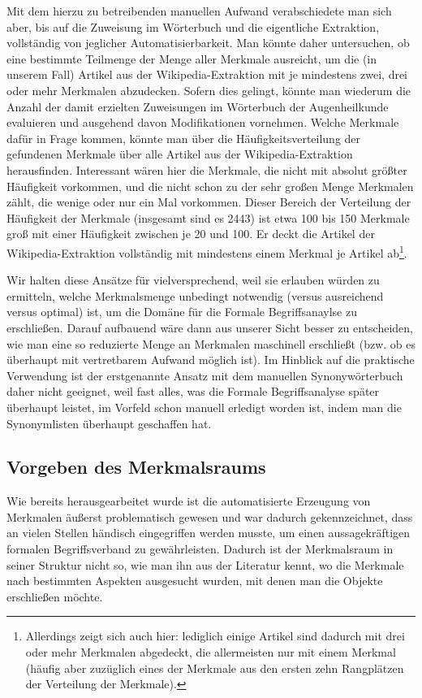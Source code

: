 \documentclass[pagesize,DIV=calc,12pt,draft]{scrreprt}
\begin{document}
Mit dem hierzu zu betreibenden manuellen Aufwand verabschiedete man sich aber, bis auf die Zuweisung im Wörterbuch und die eigentliche Extraktion, vollständig von jeglicher Automatisierbarkeit.
Man könnte daher untersuchen, ob eine bestimmte Teilmenge der Menge aller Merkmale ausreicht, um die (in unserem Fall) Artikel aus der Wikipedia-Extraktion mit je mindestens zwei, drei oder mehr Merkmalen abzudecken.
Sofern dies gelingt, könnte man wiederum die Anzahl der damit erzielten Zuweisungen im Wörterbuch der Augenheilkunde evaluieren und ausgehend davon Modifikationen vornehmen.
Welche Merkmale dafür in Frage kommen, könnte man über die Häufigkeitsverteilung der gefundenen Merkmale über alle Artikel aus der Wikipedia-Extraktion herausfinden.
Interessant wären hier die Merkmale, die nicht mit absolut größter Häufigkeit vorkommen, und die nicht schon zu der sehr großen Menge Merkmalen zählt, die wenige oder nur ein Mal vorkommen.
Dieser Bereich der Verteilung der Häufigkeit der Merkmale (insgesamt sind es 2443) ist etwa 100 bis 150 Merkmale groß mit einer Häufigkeit zwischen je 20 und 100.
Er deckt die Artikel der Wikipedia-Extraktion vollständig mit mindestens einem Merkmal je Artikel ab\footnote{Allerdings zeigt sich auch hier: lediglich einige Artikel sind dadurch mit drei oder mehr Merkmalen abgedeckt, die allermeisten nur mit einem Merkmal (häufig aber zuzüglich eines der Merkmale aus den ersten zehn Rangplätzen der Verteilung der Merkmale).}.

Wir halten diese Ansätze für vielversprechend, weil sie erlauben würden zu ermitteln, welche Merkmalsmenge unbedingt notwendig (versus ausreichend versus optimal) ist, um die Domäne für die Formale Begriffsanaylse zu erschließen.
Darauf aufbauend wäre dann aus unserer Sicht besser zu entscheiden, wie man eine so reduzierte Menge an Merkmalen maschinell erschließt (bzw. ob es überhaupt mit vertretbarem Aufwand möglich ist).
Im Hinblick auf die praktische Verwendung ist der erstgenannte Ansatz mit dem manuellen Synonywörterbuch daher nicht geeignet, weil fast alles, was die Formale Begriffsanalyse später überhaupt leistet, im Vorfeld schon manuell erledigt worden ist, indem man die Synonymlisten überhaupt geschaffen hat.

\subsection{Vorgeben des Merkmalsraums}

Wie bereits herausgearbeitet wurde ist die automatisierte Erzeugung von Merkmalen äußerst problematisch gewesen und war dadurch gekennzeichnet, dass an vielen Stellen händisch eingegriffen werden musste, um einen aussagekräftigen formalen Begriffsverband zu gewährleisten. 
Dadurch ist der Merkmalsraum in seiner Struktur nicht so, wie man ihn aus der Literatur kennt, wo die Merkmale nach bestimmten Aspekten ausgesucht wurden, mit denen man die Objekte erschließen möchte.
\end{document}
